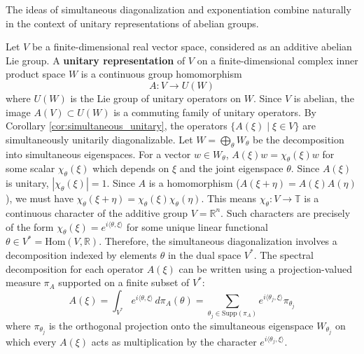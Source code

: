 The ideas of simultaneous diagonalization and exponentiation combine naturally in the context of unitary representations of abelian groups.

\begin{example}
\label{ex:unitary_rep_Rn}
Let $V$ be a finite-dimensional real vector space, considered as an additive abelian Lie group. A \textbf{unitary representation} of $V$ on a finite-dimensional complex inner product space $W$ is a continuous group homomorphism
\begin{equation} \label{eq:4.22}
A: V \longrightarrow U(W)
\end{equation}
where $U(W)$ is the Lie group of unitary operators on $W$. Since $V$ is abelian, the image $A(V) \subset U(W)$ is a commuting family of unitary operators. By Corollary \ref{cor:simultaneous_unitary}, the operators $\{A(\xi) \mid \xi \in V\}$ are simultaneously unitarily diagonalizable.
Let $W = \bigoplus_{\theta} W_\theta$ be the decomposition into simultaneous eigenspaces. For a vector $w \in W_\theta$, $A(\xi)w = \chi_\theta(\xi) w$ for some scalar $\chi_\theta(\xi)$ which depends on $\xi$ and the joint eigenspace $\theta$. Since $A(\xi)$ is unitary, $|\chi_\theta(\xi)| = 1$. Since $A$ is a homomorphism ($A(\xi+\eta) = A(\xi)A(\eta)$), we must have $\chi_\theta(\xi+\eta) = \chi_\theta(\xi)\chi_\theta(\eta)$. This means $\chi_\theta: V \to \mathbb{T}$ is a continuous character of the additive group $V=\mathbb{R}^n$. Such characters are precisely of the form $\chi_\theta(\xi) = e^{i \langle \theta, \xi \rangle}$ for some unique linear functional $\theta \in V^* = \text{Hom}(V, \mathbb{R})$.
Therefore, the simultaneous diagonalization involves a decomposition indexed by elements $\theta$ in the dual space $V^*$. The spectral decomposition for each operator $A(\xi)$ can be written using a projection-valued measure $\pi_A$ supported on a finite subset of $V^*$:
\begin{equation} \label{eq:4.23}
A(\xi) = \int_{V^*} e^{i\langle \theta, \xi \rangle} \, d\pi_A(\theta) = \sum_{\theta_j \in \text{Supp}(\pi_A)} e^{i\langle \theta_j, \xi \rangle} \pi_{\theta_j}
\end{equation}
where $\pi_{\theta_j}$ is the orthogonal projection onto the simultaneous eigenspace $W_{\theta_j}$ on which every $A(\xi)$ acts as multiplication by the character $e^{i\langle \theta_j, \xi \rangle}$.
\end{example}

